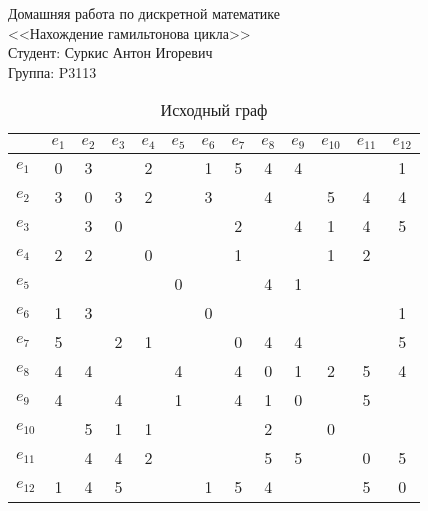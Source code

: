 \documentclass[a4paper,12pt]{article}
\begin{document}
    \pagestyle{fancy}
    \fancyfoot{}

    \noindent
    Домашняя работа по дискретной математике \\
    <<Нахождение гамильтонова цикла>> \\
    Студент: Суркис Антон Игоревич \\
    Группа: P3113

    \begin{table}[H]
        \centering
        \caption{Исходный граф}
        \begin{tabular}{l*{3}{|cccc}}
            &$e_{1}$&$e_{2}$&$e_{3}$&$e_{4}$&$e_{5}$&$e_{6}$&$e_{7}$&$e_{8}$&$e_{9}$&$e_{10}$&$e_{11}$&$e_{12}$\\
            \hline
            $e_{1}$&0&3&&2&&1&5&4&4&&&1\\
            $e_{2}$&3&0&3&2&&3&&4&&5&4&4\\
            $e_{3}$&&3&0&&&&2&&4&1&4&5\\
            $e_{4}$&2&2&&0&&&1&&&1&2&\\
            \hline
            $e_{5}$&&&&&0&&&4&1&&&\\
            $e_{6}$&1&3&&&&0&&&&&&1\\
            $e_{7}$&5&&2&1&&&0&4&4&&&5\\
            $e_{8}$&4&4&&&4&&4&0&1&2&5&4\\
            \hline
            $e_{9}$&4&&4&&1&&4&1&0&&5&\\
            $e_{10}$&&5&1&1&&&&2&&0&&\\
            $e_{11}$&&4&4&2&&&&5&5&&0&5\\
            $e_{12}$&1&4&5&&&1&5&4&&&5&0\\
        \end{tabular}
    \end{table}
\end{document}
